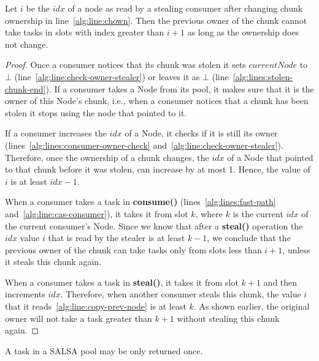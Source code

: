 \begin{lemma}
 \label{lemma:no-inc-after-steal}
 Let $i$ be the $idx$ of a node as read by a stealing consumer after changing chunk ownership in line~\ref{alg:line:chown}. Then the previous owner of the chunk cannot take tasks in slots with index greater than $i+1$ as long as the ownership does not change.
\end{lemma}
\begin{proof}
Once a consumer notices that its chunk was stolen it sets $currentNode$ to $\bot$ (line~\ref{alg:line:check-owner-stealer}) or leaves it as $\bot$ (line~\ref{alg:lines:stolen-chunk-end}). If a consumer takes a Node from its pool, it makes sure that it is the owner of this Node's chunk, i.e., when a consumer notices that a chunk has been stolen it stops using the node that pointed to it.

If a consumer increases the $idx$ of a Node, it checks if it is still its owner (lines~\ref{alg:lines:consumer-owner-check} and~\ref{alg:line:check-owner-stealer}). Therefore, once the ownership of a chunk changes, the $idx$ of a Node that pointed to that chunk before it was stolen, can increase by at most 1. Hence, the value of $i$ is at least $idx-1$.

When a consumer takes a task in {\bf consume()} (lines~\ref{alg:lines:fast-path} and~\ref{alg:line:cas-consumer}), it takes it from slot $k$, where $k$ is the current $idx$ of the current consumer's Node. Since we know that after a {\bf steal()} operation the $idx$ value $i$ that is read by the stealer is at least $k-1$, we conclude that the previous owner of the chunk can take tasks only from slots less than $i+1$, unless it steals this chunk again.

When a consumer takes a task in {\bf steal()}, it takes it from slot $k+1$ and then increments $idx$. Therefore, when another consumer steals this chunk, the value $i$ that it reads~\ref{alg:line:copy-prev-node} is at least $k$. As shown earlier, the original owner will not take a task greater than $k+1$ without stealing this chunk again. 
\end{proof}

\begin{claim}
\label{salsa-consumer-claim}
A task in a SALSA pool may be only returned once.
\end{claim}

